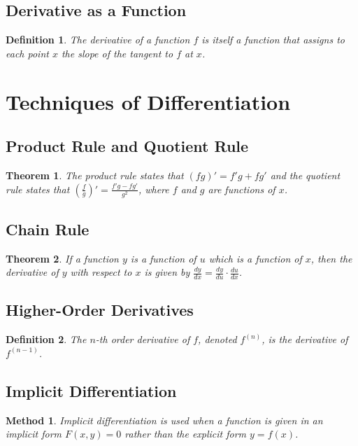 \documentclass[a4paper,12pt]{book}
\newtheorem{theorem}{Theorem}
\newtheorem{definition}{Definition}
\newtheorem{method}{Method}
\begin{document}
\subsection{Derivative as a Function}
\begin{definition}
The derivative of a function \( f \) is itself a function that assigns to each point \( x \) the slope of the tangent to \( f \) at \( x \).
\end{definition}

\section{Techniques of Differentiation}
\subsection{Product Rule and Quotient Rule}
\begin{theorem}
The product rule states that \( (fg)' = f'g + fg' \) and the quotient rule states that \( \left(\frac{f}{g}\right)' = \frac{f'g - fg'}{g^2} \), where \( f \) and \( g \) are functions of \( x \).
\end{theorem}

\subsection{Chain Rule}
\begin{theorem}
If a function \( y \) is a function of \( u \) which is a function of \( x \), then the derivative of \( y \) with respect to \( x \) is given by \( \frac{dy}{dx} = \frac{dy}{du} \cdot \frac{du}{dx} \).
\end{theorem}

\subsection{Higher-Order Derivatives}
\begin{definition}
The \( n \)-th order derivative of \( f \), denoted \( f^{(n)} \), is the derivative of \( f^{(n-1)} \).
\end{definition}

\subsection{Implicit Differentiation}
\begin{method}
Implicit differentiation is used when a function is given in an implicit form \( F(x, y) = 0 \) rather than the explicit form \( y = f(x) \).
\end{method}
\end{document}
